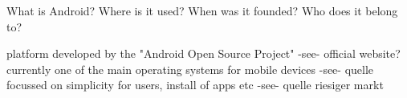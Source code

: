 What is Android? Where is it used? When was it founded? Who does it belong to?\newline


platform developed by the "Android Open Source Project" -see- official website?\newline
currently one of the main operating systems for mobile devices -see- quelle\newline
focussed on simplicity for users, install of apps etc -see- quelle\newline
riesiger markt\newline
